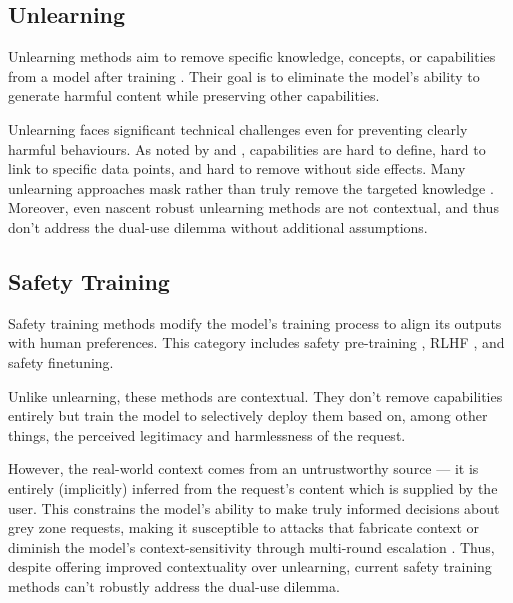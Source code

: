 \documentclass{article}
\theoremstyle{plain}
\theoremstyle{definition}
\theoremstyle{remark}
\begin{document}
\subsection{Unlearning}

Unlearning methods aim to remove specific knowledge, concepts, or
capabilities from a model after training
\cite{liu2024rethinkingmachineunlearninglarge}. Their goal is to
eliminate the model's ability to generate harmful content while
preserving other capabilities.

Unlearning faces significant technical challenges even for preventing
clearly harmful behaviours. As noted by \citet{cooper2024machineunlearningdoesntthink} and
\citet{barez2025openproblemsmachineunlearning}, capabilities are hard
to define, hard to link to specific data points, and hard to remove
without side effects. Many unlearning approaches mask rather than
truly remove the targeted knowledge
\cite{deeb2025unlearningmethodsremoveinformation}. Moreover, even
nascent robust unlearning methods
\cite{cloud2024gradientroutingmaskinggradients} are not contextual,
and thus don't address the dual-use dilemma without additional assumptions.

\subsection{Safety Training}

Safety training methods modify the model's training process to align
its outputs with human preferences. This category includes safety
pre-training \cite{maini2025safetypretraininggenerationsafe}, RLHF
\cite{christiano2023deepreinforcementlearninghuman}, and safety finetuning.

Unlike unlearning, these methods are contextual. They don't remove
capabilities entirely but train the model to selectively deploy them
based on, among other things, the perceived legitimacy and
harmlessness of the request.

However, the real-world context comes from an untrustworthy source
--- it is entirely (implicitly) inferred from the request's content
which is supplied by the user. This constrains the model's ability to
make truly informed decisions about grey zone requests, making it
susceptible to attacks that fabricate context
\cite{zeng2024johnnypersuadellmsjailbreak} or diminish the model's
context-sensitivity through multi-round escalation
\cite{russinovich2025greatwritearticlethat}.
Thus, despite offering improved contextuality over unlearning,
current safety training methods can't robustly address the dual-use dilemma.
\end{document}
